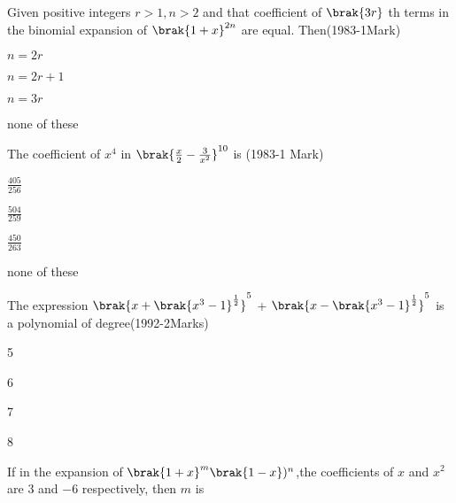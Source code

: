 





\iffalse
  \title{Assignment}
  \author{Kotha Pratheek Reddy}
  \section{mcq-single}
\fi


\item   Given positive integers $r>1,n>2$ and that {coefficient} of $\brak{3r}$ th terms in the binomial expansion of $\brak{1+x}^{2n}$ are equal. Then\hfill(1983-1Mark)
\begin{enumerate}\begin{multicols}{2}
\item $n=2r$
\item $n=2r+1$
\item $n=3r$
\item none of these
\end{multicols}
\end{enumerate}
\item The coefficient of $x^4$ in $\brak{\frac{x}{2}-\frac{3}{x^2}}^{10}$ is \hfill(1983-1 Mark)
\begin{enumerate}
\begin{multicols}{2}
\item $\frac{405}{256}$
\item $\frac{504}{259}$
    
\item $\frac{450}{263}$
\item none of these
\end{multicols}
\end{enumerate}
\item The expression $\brak{x+\brak{x^3-1}^{\frac{1}{2}}}^5$ + $\brak{x-\brak{x^3-1}^{\frac{1}{2}}}^5$ is a polynomial of degree\hfill(1992-2Marks)
\begin{enumerate}
\begin{multicols}{2}
    

    \item 5
    \item 6
    \item 7
    \item 8
    \end{multicols}
\end{enumerate}
\item If in the expansion of $\brak{1+x}^m\brak{1-x})^n$,the coefficients of $x$ and $x^2$ are $3$ and $-6$ respectively, then $m$ is
